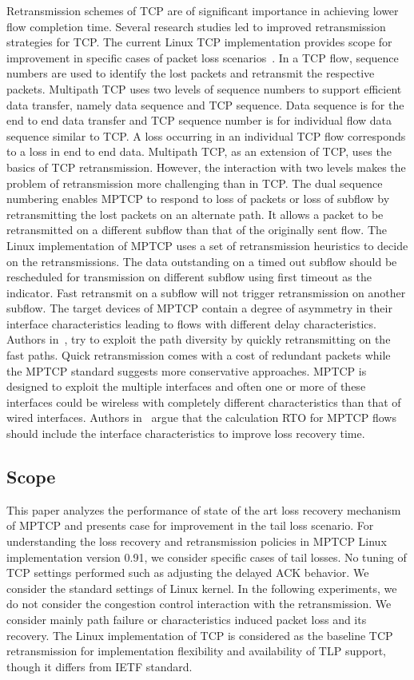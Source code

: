 \documentclass[10pt,draftcls,twocolumn]{IEEEconf}
\begin{document}
Retransmission schemes of TCP are of significant importance in achieving lower flow completion time. Several research studies led to improved retransmission strategies for TCP. The current Linux TCP implementation provides scope for improvement in specific cases of packet loss scenarios~\cite{prr}. In a TCP flow, sequence numbers are used to identify the lost packets and retransmit the respective packets. Multipath TCP uses two levels of sequence numbers to support efficient data transfer, namely data sequence and TCP sequence. Data sequence is for the end to end data transfer and TCP sequence number is for individual flow data sequence similar to TCP. A loss occurring in an individual TCP flow corresponds to a loss in end to end data. Multipath TCP, as an extension of TCP, uses the basics of TCP retransmission. However, the interaction with two levels makes the problem of retransmission more challenging than in TCP. The dual sequence numbering enables MPTCP to respond to loss of packets or loss of subflow by retransmitting the lost packets on an alternate path. It allows a packet to be retransmitted on a different subflow than that of the originally sent flow. The Linux implementation of MPTCP uses a set of retransmission heuristics to decide on the retransmissions. The data outstanding on a timed out subflow should be rescheduled for transmission on different subflow using first timeout as the indicator. Fast retransmit on a subflow will not trigger retransmission on another subflow. The target devices of MPTCP contain a degree of asymmetry in their interface characteristics leading to flows with different delay characteristics. Authors in~\cite{fuso}, try to exploit the path diversity by quickly retransmitting on the fast paths. Quick retransmission comes with a cost of redundant packets while the MPTCP standard suggests more conservative approaches. MPTCP is designed to exploit the multiple interfaces and often one or more of these interfaces could be wireless with completely different characteristics than that of wired interfaces. Authors in~\cite{Shin} argue that the calculation RTO for MPTCP flows should include the interface characteristics to improve loss recovery time. 


\subsection{Scope}\label{scope}

This paper analyzes the performance of state of the art loss recovery mechanism of MPTCP and presents case for improvement in the tail loss scenario. 
For understanding the loss recovery and retransmission policies in MPTCP Linux implementation version 0.91, we consider specific cases of tail losses.  
No tuning of TCP settings performed such as adjusting the delayed ACK behavior. We consider the standard settings of Linux kernel. In the following experiments, 
we do not consider the congestion control interaction with the retransmission. We consider mainly path failure or characteristics induced packet loss and its recovery.
The Linux implementation of TCP is considered as the baseline TCP retransmission for implementation flexibility and availability of TLP support, though it differs from IETF standard.
\end{document}

